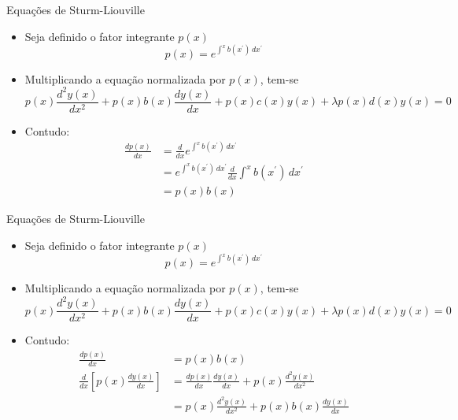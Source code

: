       \begin{slide}[toc=]{Equações de Sturm-Liouville}
		\begin{itemize}
			\item Seja definido o fator integrante $p(x)$
				\begin{equation*}
					p(x) = e^{\int^x b(x^\prime)\,dx^\prime} 
				\end{equation*}
			\item Multiplicando a equação normalizada por $p(x)$, tem-se 
				\begin{equation*}
					p(x)\frac{d^2y(x)}{dx^2} + p(x)b(x)\frac{dy(x)}{dx}+ p(x)c(x)y(x)+\lambda p(x)d(x)y(x) = 0 
				\end{equation*}
			\item Contudo:
						\begin{align*}
							\frac{dp(x)}{dx} &= \frac{d}{dx}e^{\int^x b(x^\prime)\,dx^\prime}\\
									 &= e^{\int^x b(x^\prime)\,dx^\prime}\frac{d}{dx}\int^x b(x^\prime)\,dx^\prime\\
									 &= p(x)b(x)
						\end{align*}
		\end{itemize}
      \end{slide}
   
      \begin{slide}[toc=]{Equações de Sturm-Liouville}
		\begin{itemize}
			\item Seja definido o fator integrante $p(x)$
				\begin{equation*}
					p(x) = e^{\int^x b(x^\prime)\,dx^\prime} 
				\end{equation*}
			\item Multiplicando a equação normalizada por $p(x)$, tem-se 
				\begin{equation*}
					p(x)\frac{d^2y(x)}{dx^2} + p(x)b(x)\frac{dy(x)}{dx}+ p(x)c(x)y(x)+\lambda p(x)d(x)y(x) = 0 
				\end{equation*}
			\item Contudo:
						\begin{align*}
							\frac{dp(x)}{dx} &= p(x)b(x)\\
							\frac{d}{dx}\left [p(x)\frac{dy(x)}{dx} \right ] &= \frac{dp(x)}{dx}\frac{dy(x)}{dx}+p(x)\frac{d^2y(x)}{dx^2}\\
									 &= p(x)\frac{d^2y(x)}{dx^2}+ p(x)b(x)\frac{dy(x)}{dx}
						\end{align*}
		\end{itemize}
      \end{slide}

